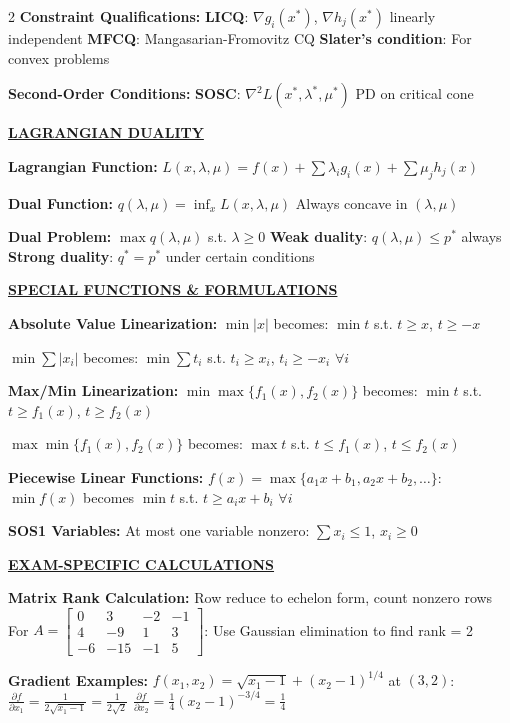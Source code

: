 \documentclass[8pt,a4paper,landscape]{article}
\newcommand{\mysection}[1]{\textbf{\underline{#1}}}
\newcommand{\mysubsection}[1]{\textbf{#1:}}
\begin{document}
\begin{multicols}{2}
\mysubsection{Constraint Qualifications}
\textbf{LICQ}: $\nabla g_i(x^*)$, $\nabla h_j(x^*)$ linearly independent
\textbf{MFCQ}: Mangasarian-Fromovitz CQ
\textbf{Slater's condition}: For convex problems

\mysubsection{Second-Order Conditions}
\textbf{SOSC}: $\nabla^2 L(x^*, \lambda^*, \mu^*)$ PD on critical cone

\mysection{LAGRANGIAN DUALITY}

\mysubsection{Lagrangian Function}
$L(x, \lambda, \mu) = f(x) + \sum \lambda_i g_i(x) + \sum \mu_j h_j(x)$

\mysubsection{Dual Function}
$q(\lambda, \mu) = \inf_x L(x, \lambda, \mu)$
Always concave in $(\lambda, \mu)$

\mysubsection{Dual Problem}
$\max q(\lambda, \mu)$ s.t. $\lambda \geq 0$
\textbf{Weak duality}: $q(\lambda, \mu) \leq p^*$ always
\textbf{Strong duality}: $q^* = p^*$ under certain conditions

\mysection{SPECIAL FUNCTIONS \& FORMULATIONS}

\mysubsection{Absolute Value Linearization}
$\min |x|$ becomes:
$\min t$ s.t. $t \geq x$, $t \geq -x$

$\min \sum |x_i|$ becomes:
$\min \sum t_i$ s.t. $t_i \geq x_i$, $t_i \geq -x_i$ $\forall i$

\mysubsection{Max/Min Linearization}
$\min \max\{f_1(x), f_2(x)\}$ becomes:
$\min t$ s.t. $t \geq f_1(x)$, $t \geq f_2(x)$

$\max \min\{f_1(x), f_2(x)\}$ becomes:
$\max t$ s.t. $t \leq f_1(x)$, $t \leq f_2(x)$

\columnbreak

\mysubsection{Piecewise Linear Functions}
$f(x) = \max\{a_1x + b_1, a_2x + b_2, \ldots\}$:
$\min f(x)$ becomes $\min t$ s.t. $t \geq a_ix + b_i$ $\forall i$

\mysubsection{SOS1 Variables}
At most one variable nonzero: $\sum x_i \leq 1$, $x_i \geq 0$

\mysection{EXAM-SPECIFIC CALCULATIONS}

\mysubsection{Matrix Rank Calculation}
Row reduce to echelon form, count nonzero rows
For $A = \begin{bmatrix} 0 & 3 & -2 & -1 \\ 4 & -9 & 1 & 3 \\ -6 & -15 & -1 & 5 \end{bmatrix}$:
Use Gaussian elimination to find rank = 2

\mysubsection{Gradient Examples}
$f(x_1,x_2) = \sqrt{x_1-1} + (x_2-1)^{1/4}$ at $(3,2)$:
$\frac{\partial f}{\partial x_1} = \frac{1}{2\sqrt{x_1-1}} = \frac{1}{2\sqrt{2}}$
$\frac{\partial f}{\partial x_2} = \frac{1}{4}(x_2-1)^{-3/4} = \frac{1}{4}$


\end{multicols}
\end{document}
